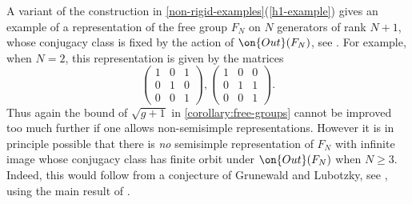 \begin{remark}
\notready
	\label{example:free-group-bounds}
	A variant of the construction in \autoref{non-rigid-examples}(\ref{h1-example})
gives an example of a representation of the free group $F_N$ on $N$ generators
of rank $N+1$, whose conjugacy class is fixed by the action of $\on{Out}(F_N)$,
see \cite[p.~1444]{potapchik2000low}. For example, when $N=2$, this representation is given by the matrices $$\begin{pmatrix} 1 & 0 & 1 \\ 0 & 1 & 0 \\ 0 & 0 & 1 \end{pmatrix}, \begin{pmatrix} 1 & 0 & 0 \\ 0 & 1 & 1 \\ 0 & 0 & 1 \end{pmatrix}.$$
Thus again the bound of $\sqrt{g+1}$ in
\autoref{corollary:free-groups} cannot be improved too much further if one
allows non-semisimple representations. However it is in principle possible that
there is \emph{no} semisimple representation of $F_N$ with infinite image whose
conjugacy class has finite orbit under $\on{Out}(F_N)$ when $N\geq 3$. Indeed, this would
follow from a conjecture of Grunewald and Lubotzky, see \cite[\S9.2]{grunewald2009linear}, using the main result of \cite{farb2017moving}.


\end{remark}
